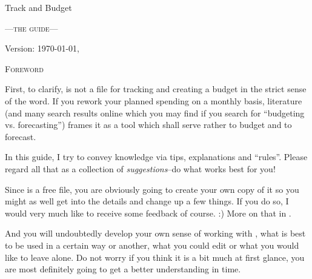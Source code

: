 
\begin{center}\LARGE
Track and Budget
\end{center}
\begin{center}\scshape\large\sffamily
	---the guide---
\end{center}

\vfill
\begin{center}
Version: \today, \thistime
\end{center}

\clearpage
\begin{center}\large\scshape
	Foreword
\end{center}
First, to clarify, \tfn is not a file for tracking and creating a budget in the strict sense of the word.
If you rework your planned spending on a monthly basis, literature (and many search results online which you may find if you search for ``budgeting vs. forecasting'') frames it as a tool which shall serve rather to budget and to forecast.

In this guide, I try to convey knowledge via tips, explanations and ``rules''.
Please regard all that as a collection of \emph{suggestions}--do what works best for you!

Since \tfn is a free file, you are obviously going to create your own copy of it so you might as well get into the details and change up a few things.
If you do so, I would very much like to receive some feedback of course. :)
More on that in .

And you will undoubtedly develop your own sense of working with \tfn, what is best to be used in a certain way or another, what you could edit or what you would like to leave alone.
Do not worry if you think it is a bit much at first glance, you are most definitely going to get a better understanding in time.

